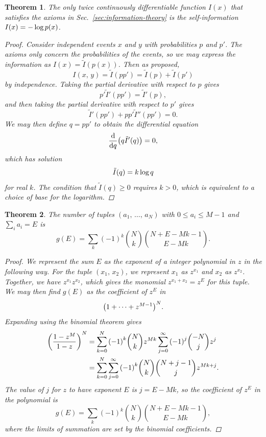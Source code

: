 \documentclass[aps,reprint]{revtex4-2}
\renewcommand\mathrm\textnormal%
\theoremstyle{plain}
\newtheorem{thm}{Theorem}[section]
\theoremstyle{definition}
\renewcommand\leq\leqslant%
\renewcommand\log{\operatorname{\mathrm{log}}}
\begin{document}
\begin{thm}\label{thm:self-information}
  The only twice continuously differentiable function $I(x)$ that satisfies the
  axioms in Sec.~\ref{sec:information-theory} is the self-information $I(x) =
  -\log p(x)$.
  \begin{proof}
    Consider independent events $x$ and $y$ with probabilities $p$ and $p'$. The
    axioms only concern the probabilities of the events, so we may express the
    information as $I(x) = \tilde{I}(p(x))$. Then as proposed,
    \[
      I(x,\, y)
      = \tilde{I}(pp')
      = \tilde{I}(p) + \tilde{I}(p')
    \]
    by independence. Taking the partial derivative with respect to $p$ gives
    \[
      p' \tilde{I}'(pp')
      = \tilde{I}'(p),
    \]
    and then taking the partial derivative with respect to $p'$ gives
    \[
      \tilde{I}'(pp') + pp' \tilde{I}''(pp')
      = 0.
    \]
    We may then define $q = pp'$ to obtain the differential equation
    \[
      \dv{q}\qty(q \tilde{I}'(q))
      = 0,
    \]
    which has solution
    \[
      \tilde{I}(q) = k\log q
    \]
    for real $k$. The condition that $\tilde{I}(q) \ge 0$ requires $k > 0$,
    which is equivalent to a choice of base for the logarithm.
  \end{proof}
\end{thm}

\begin{thm}\label{thm:bw-g}
  The number of tuples $(a_1,\, \ldots,\, a_N)$ with $0 \leq a_i \leq M - 1$ and
  $\sum_i a_i = E$ is
  \[
    g(E)
    = \sum_k {(-1)}^k \binom{N}{k} \binom{N + E - Mk - 1}{E - Mk}.
  \]
  \begin{proof}
    We represent the sum $E$ as the exponent of a integer polynomial in $z$ in
    the following way. For the tuple $(x_1,\, x_2)$, we represent $x_1$ as
    $z^{x_1}$ and $x_2$ as $z^{x_2}$. Together, we have $z^{x_1} z^{x_2}$,
    which gives the monomial $z^{x_1 + x_2} = z^E$ for this tuple. We may then
    find $g(E)$ as the coefficient of $z^E$ in
    \[
      {\qty(1 + \cdots + z^{M-1})}^N.
    \]
    Expanding using the binomial theorem gives
    \begin{align}
      {\qty(\frac{1 - z^M}{1 - z})}^N
      &= \sum_{k=0}^N {(-1)}^k \binom{N}{k} z^{Mk}
      \sum_{j=0}^\infty {(-1)}^j \binom{-N}{j} z^j \\
      &= \sum_{k=0}^N \sum_{j=0}^\infty {(-1)}^k \binom{N}{k}
      \binom{N + j - 1}{j} z^{Mk + j}.
    \end{align}
    The value of $j$ for $z$ to have exponent $E$ is $j = E - Mk$, so the
    coefficient of $z^E$ in the polynomial is
    \begin{equation}
      g(E)
      = \sum_k {(-1)}^k \binom{N}{k} \binom{N + E - Mk - 1}{E - Mk},
    \end{equation}
    where the limits of summation are set by the binomial coefficients.
  \end{proof}
\end{thm}
\end{document}
